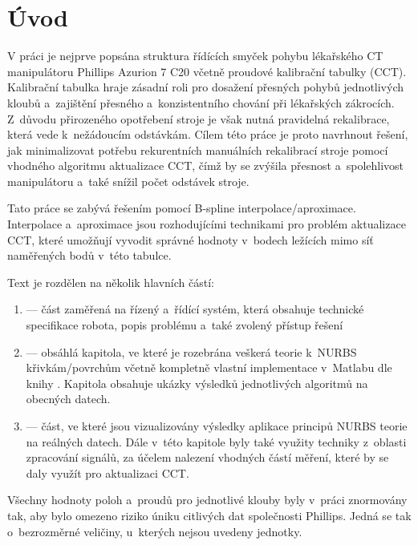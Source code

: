 \section{Úvod}
V práci je nejprve popsána struktura řídících smyček pohybu lékařského CT manipulátoru Phillips Azurion 7 C20
včetně proudové kalibrační tabulky (CCT). Kalibrační tabulka hraje zásadní roli pro dosažení přesných pohybů jednotlivých kloubů a~zajištění přesného a~konzistentního chování při lékařských zákrocích. Z~důvodu přirozeného opotřebení stroje je však nutná pravidelná rekalibrace, která vede k~nežádoucím odstávkám. Cílem této práce je proto navrhnout řešení, jak minimalizovat potřebu rekurentních manuálních rekalibrací stroje pomocí vhodného algoritmu aktualizace CCT, čímž by se zvýšila přesnost a~spolehlivost manipulátoru a~také snížil počet odstávek stroje.
\par
Tato práce se zabývá řešením pomocí B-spline interpolace/aproximace. Interpolace a~aproximace jsou rozhodujícími technikami pro problém aktualizace CCT, které umožňují vyvodit správné hodnoty v~bodech ležících mimo síť naměřených bodů v~této tabulce.\par
Text je rozdělen na několik hlavních částí:
\begin{enumerate}
    \item {} --- část zaměřená na řízený a~řídící systém, která obsahuje technické specifikace robota, popis problému a~také zvolený přístup řešení
    \item {} --- obsáhlá kapitola, ve které je rozebrána veškerá teorie k~NURBS křivkám/povrchům včetně kompletně vlastní implementace v~Matlabu dle knihy \cite{The_NURBS_Book}. Kapitola obsahuje ukázky výsledků jednotlivých algoritmů na obecných datech.
    \item {} --- část, ve které jsou vizualizovány výsledky aplikace principů NURBS teorie na reálných datech. Dále v~této kapitole byly také využity techniky z~oblasti zpracování signálů, za účelem nalezení vhodných částí měření, které by se daly využít pro aktualizaci CCT.
\end{enumerate}
Všechny hodnoty poloh a~proudů pro jednotlivé klouby byly v~práci znormovány tak, aby bylo omezeno riziko úniku citlivých dat společnosti Phillips. Jedná se tak o~bezrozměrné veličiny, u~kterých nejsou uvedeny jednotky.
\par
